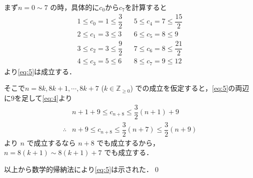 \documentclass[../../main.tex]{subfiles}
\begin{document}
まず$n=0\sim 7$ の時，具体的に$c_0$から$c_7$を計算すると
\begin{align}
  1 \le c_0 = 1 \le \dfrac{3}{2}  && 5 \le c_4 = 7 \le \dfrac{15}{2} \\
  2 \le c_1 = 3 \le 3             && 6 \le c_5 = 8 \le 9 \\
  3 \le c_2 = 3 \le \dfrac{9}{2}  && 7 \le c_6 = 8 \le \dfrac{21}{2} \\
  4 \le c_3 = 5 \le 6             && 8 \le c_7 = 9 \le 12
\end{align}
より\cref{eq:5}は成立する．

そこで$n=8k, 8k+1, \cdots, 8k+7$ ($k \in \mathbb{Z}_{\ge 0}$) での成立を仮定すると，\cref{eq:5}の両辺に$9$を足して\cref{eq:4}より
\begin{align}
  & n+1+9 \le c_{n+8} \le \dfrac{3}{2}(n+1)+9 \\
  \therefore
  & n+9 \le c_{n+8} \le \dfrac{3}{2}(n+7) \le \dfrac{3}{2}(n+9)
\end{align}
より $n$ で成立するなら $n+8$ でも成立するから，$n=8(k+1)\sim 8(k+1)+7$ でも成立する．

以上から数学的帰納法により\cref{eq:5}は示された．\qed
\end{document}
